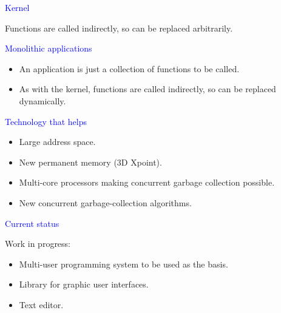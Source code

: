 \documentclass{slides}
\newcommand{\ti}[1]{\begin{center}\Large{\textcolor{blue}{#1}}\end{center}}
\begin{document}
\begin{slide}\ti{Kernel}

Functions are called indirectly, so can be replaced arbitrarily.

\vfill\end{slide}
\begin{slide}\ti{Monolithic applications}

  \begin{itemize}
  \item An application is just a collection of functions to be
    called.
  \item As with the kernel, functions are called indirectly, so can be
    replaced dynamically.
  \end{itemize}

\vfill\end{slide}
\begin{slide}\ti{}

\vfill\end{slide}
\begin{slide}\ti{}

\vfill\end{slide}
\begin{slide}\ti{Technology that helps}

  \begin{itemize}
  \item Large address space.
  \item New permanent memory (3D Xpoint).
  \item Multi-core processors making concurrent garbage collection
    possible. 
  \item New concurrent garbage-collection algorithms.
  \end{itemize}

\vfill\end{slide}
\begin{slide}\ti{Current status}

Work in progress:

  \begin{itemize}
  \item Multi-user programming system to be used as the basis.
  \item Library for graphic user interfaces.
  \item Text editor.
  \end{itemize}

\vfill\end{slide}
\end{document}
